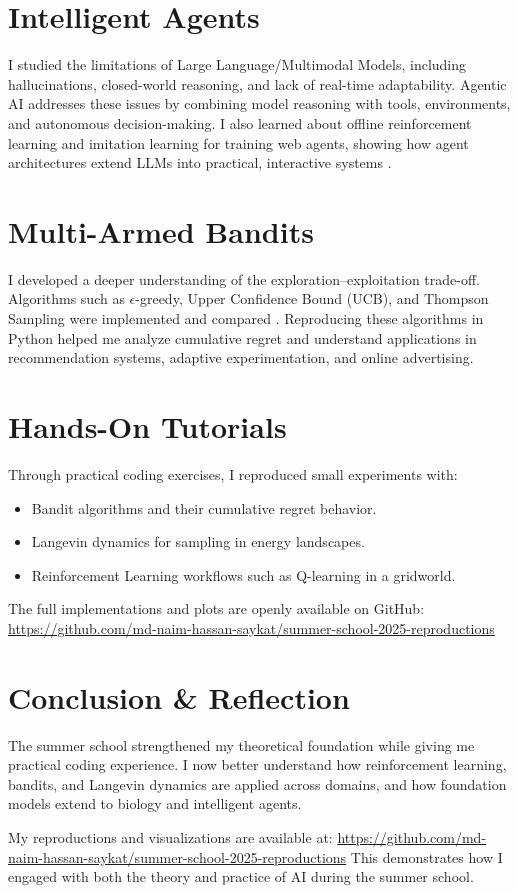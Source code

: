 \documentclass[11pt,a4paper]{article}
\begin{document}
\section{Intelligent Agents}
I studied the limitations of Large Language/Multimodal Models, including hallucinations, closed-world reasoning, and lack of real-time adaptability.  
Agentic AI addresses these issues by combining model reasoning with tools, environments, and autonomous decision-making.  
I also learned about offline reinforcement learning and imitation learning for training web agents, showing how agent architectures extend LLMs into practical, interactive systems \cite{wang2023agents}.

\section{Multi-Armed Bandits}
I developed a deeper understanding of the exploration--exploitation trade-off.  
Algorithms such as $\epsilon$-greedy, Upper Confidence Bound (UCB), and Thompson Sampling were implemented and compared \cite{lattimore2020bandit}.  
Reproducing these algorithms in Python helped me analyze cumulative regret and understand applications in recommendation systems, adaptive experimentation, and online advertising.

\section{Hands-On Tutorials}
Through practical coding exercises, I reproduced small experiments with:
\begin{itemize}
    \item Bandit algorithms and their cumulative regret behavior.  
    \item Langevin dynamics for sampling in energy landscapes.  
    \item Reinforcement Learning workflows such as Q-learning in a gridworld.  
\end{itemize}
The full implementations and plots are openly available on GitHub:  
\url{https://github.com/md-naim-hassan-saykat/summer-school-2025-reproductions}

\section{Conclusion \& Reflection}
The summer school strengthened my theoretical foundation while giving me practical coding experience.  
I now better understand how reinforcement learning, bandits, and Langevin dynamics are applied across domains, and how foundation models extend to biology and intelligent agents.  
\par My reproductions and visualizations are available at:  
\url{https://github.com/md-naim-hassan-saykat/summer-school-2025-reproductions}  
This demonstrates how I engaged with both the theory and practice of AI during the summer school.
\end{document}
